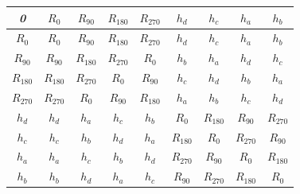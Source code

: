 \begin{sol}
\begin{table}[H]
	\centering 
	\begin{tabular}{|c|c|c|c|c|c|c|c|c|}
		\hline
		\textit{\textbf{0}}      & {\ul \textit{$R_{0}$}}      & {\ul \textit{$R_{90}$}}     & {\ul \textit{$R_{180}$}}    & {\ul \textit{$R_{270}$}}    & {\ul \textit{$h_d$}}        & {\ul \textit{$h_c$}}        & {\ul \textit{$h_a$}}        & {\ul \textit{$h_b$}}        \\ \hline
		{\ul \textit{$R_{0}$}}   & \textit{\textbf{$R_{0}$}}   & \textit{\textbf{$R_{90}$}}  & \textit{\textbf{$R_{180}$}} & \textit{\textbf{$R_{270}$}} & \textit{\textbf{$h_d$}}     & \textit{\textbf{$h_c$}}     & \textit{\textbf{$h_a$}}     & \textit{\textbf{$h_b$}}     \\ \hline
		{\ul \textit{$R_{90}$}}  & \textit{\textbf{$R_{90}$}}  & \textit{\textbf{$R_{180}$}} & \textit{\textbf{$R_{270}$}} & \textit{\textbf{$R_{0}$}}   & \textit{\textbf{$h_b$}}     & \textit{\textbf{$h_a$}}     & \textit{\textbf{$h_d$}}     & \textit{\textbf{$h_c$}}     \\ \hline
		{\ul \textit{$R_{180}$}} & \textit{\textbf{$R_{180}$}} & \textit{\textbf{$R_{270}$}} & \textit{\textbf{$R_{0}$}}   & \textit{\textbf{$R_{90}$}}  & \textit{\textbf{$h_c$}}     & \textit{\textbf{$h_d$}}     & \textit{\textbf{$h_b$}}     & \textit{\textbf{$h_a$}}     \\ \hline
		{\ul \textit{$R_{270}$}} & \textit{\textbf{$R_{270}$}} & \textit{\textbf{$R_{0}$}}   & \textit{\textbf{$R_{90}$}}  & \textit{\textbf{$R_{180}$}} & \textit{\textbf{$h_a$}}     & \textit{\textbf{$h_b$}}     & \textit{\textbf{$h_c$}}     & \textit{\textbf{$h_d$}}     \\ \hline
		{\ul \textit{$h_d$}}     & \textit{\textbf{$h_d$}}     & \textit{\textbf{$h_a$}}     & \textit{\textbf{$h_c$}}     & \textit{\textbf{$h_b$}}     & \textit{\textbf{$R_0$}}     & \textit{\textbf{$R_{180}$}} & \textit{\textbf{$R_{90}$}}  & \textit{\textbf{$R_{270}$}} \\ \hline
		{\ul \textit{$h_c$}}     & \textit{\textbf{$h_c$}}     & \textit{\textbf{$h_b$}}     & \textit{\textbf{$h_d$}}     & \textit{\textbf{$h_a$}}     & \textit{\textbf{$R_{180}$}} & \textit{\textbf{$R_0$}}     & \textit{\textbf{$R_{270}$}} & \textit{\textbf{$R_{90}$}}  \\ \hline
		{\ul \textit{$h_a$}}     & \textit{\textbf{$h_a$}}     & \textit{\textbf{$h_c$}}     & \textit{\textbf{$h_b$}}     & \textit{\textbf{$h_d$}}     & \textit{\textbf{$R_{270}$}} & \textit{\textbf{$R_{90}$}}  & \textit{\textbf{$R_0$}}     & \textit{\textbf{$R_{180}$}} \\ \hline
		{\ul \textit{$h_b$}}     & \textit{\textbf{$h_b$}}     & \textit{\textbf{$h_d$}}     & \textit{\textbf{$h_a$}}     & \textit{\textbf{$h_c$}}     & \textit{\textbf{$R_{90}$}}  & \textit{\textbf{$R_{270}$}} & \textit{\textbf{$R_{180}$}} & \textit{\textbf{$R_0$}}     \\ \hline
	\end{tabular}
\end{table}
\end{sol}

